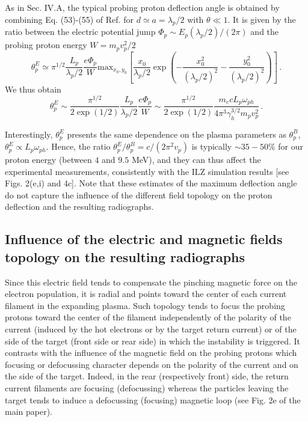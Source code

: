\documentclass[aps,showpacs,superscriptaddress]{revtex4}
\begin{document}
As in Sec. IV.A, the typical probing proton deflection angle is obtained by combining Eq.  (53)-(55) of Ref. \cite[]{RSI_protograhyb} for $d\simeq a= \lambda_p/2 $
with $\theta \ll 1$. 
It is given by the ratio between the electric potential jump $\Phi_p\sim E_p(\lambda_p/2)/(2\pi)$ and the probing proton energy $W = m_pv_p^2/2$ 
\begin{equation}\label{eq:alphaep0}
\theta^E_p \simeq \pi^{1/2}  \frac{L_p}{\lambda_p/2} \frac{e \Phi_p }{W}  \mathrm{max}_{x_0,y_0}\left[  
\frac{x_0}{\lambda_p/2}\exp\left(-\frac{x_0^2}{(\lambda_p/2)^2}-\frac{y_0^2}{ (\lambda_p/2)^2} \right) 
\right] \, .
\end{equation}
We thus obtain
\begin{equation}\label{eq:alphaep}
 \theta^E_p \sim \frac{\pi^{1/2}}{2\exp(1/2)} \frac{L_p}{\lambda_p/2} \frac{e \Phi_p }{W} 
 \sim  \frac{\pi^{1/2}}{2\exp(1/2)}   \frac{m_ecL_p\omega_{ph}}{4\pi^3\gamma_h^{3/2}m_p v_p^2 }
 \, .
\end{equation}

Interestingly,  $\theta^E_p$ presents the same dependence on the plasma parameters as  $\theta^B_p$,  $\theta^E_p\propto L_p \omega_{ph}$. Hence,  the ratio $\theta^E_p/\theta^B_p =c/(2\pi^2v_p)$  is typically $\sim 35-50$\% for our   proton energy (between $4$ and $9.5$ MeV), and they can thus affect  the experimental measurements, consistently with the ILZ simulation results [see Figs. 2(e,i) and 4c].
Note that these estimates of the maximum deflection angle do not capture the influence of the different field topology  on the proton  deflection and  the resulting radiographs.

\subsection{Influence of the electric and magnetic fields topology on the resulting radiographs}
Since this electric field tends to compensate the pinching magnetic force on the electron population, it is radial and points toward the center of each current filament in the expanding plasma. Such topology tends to focus the probing protons toward the center of the filament independently of the polarity of the current (induced by  the hot electrons or by the target return current) or of the side of the target (front side or rear side) in which the instability is triggered. 
It contrasts with the influence of the magnetic field on the probing protons which focusing or defocussing character depends on the polarity of the current and on the side of the target. Indeed,  in the rear (respectively front) side, the return current filaments are focusing (defocussing) whereas the   particles leaving the target  tends to induce a defocussing (focusing) magnetic loop (see Fig. 2e of the main paper).
\end{document}
